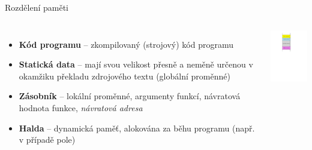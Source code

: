 \documentclass[14pt,aspectratio=169]{beamer}
\begin{document}
    \begin{frame}[t]{Rozdělení paměti}
        \begin{columns}[onlytextwidth,T]
            \column{\dimexpr\linewidth-30mm-3mm}
            \begin{itemize}
                \item \textbf{Kód programu} -- zkompilovaný (strojový) kód programu
                \item \textbf{Statická data} -- mají svou velikost přesně a neměně určenou v okamžiku překladu zdrojového textu (globální proměnné)
                \item \textbf{Zásobník} -- lokální proměnné, argumenty funkcí, návratová hodnota funkce, \emph{návratová adresa}
                \item \textbf{Halda} -- dynamická paměť, alokována za běhu programu (např. v případě pole)
            \end{itemize}
      
            \column{30mm}
            \includegraphics[width=30mm]{images/program_v_pameti.pdf}
        \end{columns}
    \end{frame}
\end{document}

